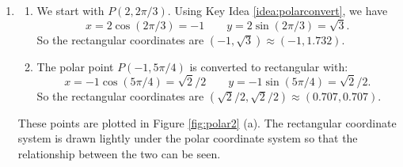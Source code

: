 {\begin{enumerate}
	\item \begin{enumerate}
		\item 
	We start with $P(2,2\pi/3)$. Using Key Idea \ref{idea:polarconvert}, we have 
	$$x= 2\cos (2\pi/3) = -1\qquad y = 2\sin (2\pi/3) = \sqrt{3}.$$
	So the rectangular coordinates are $(-1,\sqrt{3}) \approx (-1,1.732)$.
	
	\item The polar point $P(-1,5\pi/4)$ is converted to rectangular with:
	$$x=-1\cos (5\pi/4) = \sqrt{2}/2\qquad y= -1\sin (5\pi/4) = \sqrt{2}/2.$$
	So the rectangular coordinates are $(\sqrt{2}/2,\sqrt{2}/2) \approx (0.707,0.707)$.
	\end{enumerate}
	These points are plotted in Figure \ref{fig:polar2} (a). The rectangular coordinate system is drawn lightly under the polar coordinate system so that the relationship between the two can be seen.
	

\end{enumerate}}
